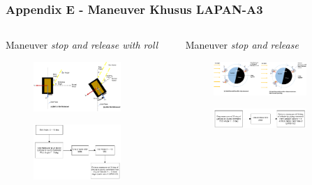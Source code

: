 \documentclass[8pt]{beamer}
\begin{document}
\begin{frame}
  \frametitle{Appendix E - Maneuver Khusus LAPAN-A3}
  \begin{columns}[T]
    \begin{block}{Maneuver \textit{stop and release with roll}}
      \begin{figure}
          \includegraphics[width=0.8\textwidth]{figure/maneuver2.png}
      \end{figure}
      \begin{figure}
          \includegraphics[width=0.8\textwidth]{figure/exmaneuver2.png}
      \end{figure}
    \end{block}
    \begin{block}{Maneuver \textit{stop and release}}
      \begin{figure}
          \includegraphics[width=0.8\textwidth]{figure/maneuver1.png}
      \end{figure}
      \begin{figure}
          \includegraphics[width=0.8\textwidth]{figure/exmaneuver1.png}
      \end{figure}
    \end{block}
  \end{columns}
\end{frame}
\end{document}

